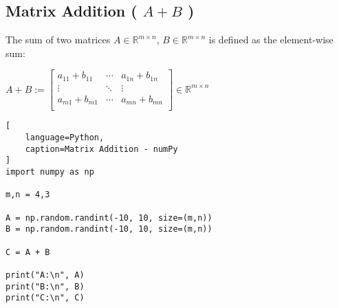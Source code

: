 \subsection{Matrix Addition ( $A+B$ ) \cite{mfml/book/mml/Deisenroth-Faisal-Ong}}

The sum of two matrices $A \in \mathbb{R}^{m\times n}$, $B \in \mathbb{R}^{m\times n}$ is defined as the element-wise sum:
\ \\

\hfill
\begin{customArrayStretch}{2}
$
    A + B
    := \begin{bmatrix}
        a_{11} + b_{11} &   \cdots  &  a_{1n} + b_{1n} \\
        \vdots          &   \ddots  &   \vdots  \\
        a_{m1} + b_{m1} &   \cdots  &  a_{mn} + b_{mn} \\
    \end{bmatrix}
    \in \mathbb{R}^{m\times n}
$
\end{customArrayStretch}
\hfill \cite{mfml/book/mml/Deisenroth-Faisal-Ong}







\begin{lstlisting}[
    language=Python,
    caption=Matrix Addition - numPy
]
import numpy as np

m,n = 4,3

A = np.random.randint(-10, 10, size=(m,n))
B = np.random.randint(-10, 10, size=(m,n))

C = A + B

print("A:\n", A)
print("B:\n", B)
print("C:\n", C)
\end{lstlisting}








